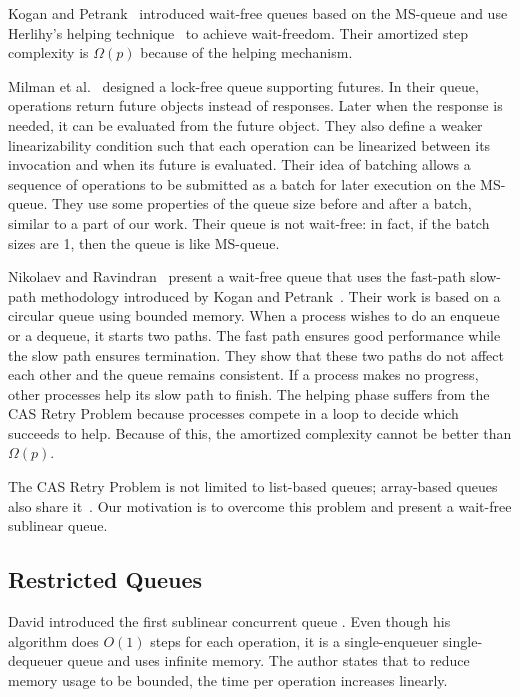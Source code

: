 \documentclass[acmsmall,nonacm,anonymous]{acmart}
\newcommand{\nf}[1]{{\normalfont{\texttt{#1}}}}
\begin{document}
Kogan and Petrank~\cite{DBLP:conf/ppopp/KoganP11} introduced wait-free queues based on the MS-queue and use Herlihy's helping technique~\cite{10.1145/114005.102808} to achieve wait-freedom. Their amortized step complexity is $\Omega(p)$ because of the helping mechanism.

Milman et al.~\cite{DBLP:conf/spaa/MilmanKLLP18} designed a lock-free queue supporting futures. In their queue, operations  return future objects instead of responses. Later when the response is needed, it can be evaluated from the future object. They also define a weaker linearizability condition such that each operation can be linearized between its invocation and when its future is evaluated. Their idea of batching allows a sequence of operations to be submitted as a batch for later execution on the MS-queue. They use some properties of the queue size before and after a batch, similar to a part of our work. Their queue is not wait-free: in fact, if the batch sizes are 1, then the queue is like MS-queue.

Nikolaev and Ravindran~\cite{10.1145/3490148.3538572} present a wait-free queue that uses the fast-path slow-path methodology introduced by Kogan and Petrank~\cite{10.1145/2370036.2145835}. Their work is based on a circular queue using bounded memory. When a process wishes to do an enqueue or a dequeue, it starts two paths. The fast path  ensures good performance while the slow path ensures termination. They show that these two paths do not affect each other and the queue remains consistent. If a process makes no progress, other processes help its slow path to finish. The helping phase suffers from the CAS Retry Problem because processes compete in a \nf{CAS} loop to decide which succeeds to help. Because of this, the amortized complexity cannot be better than $\Omega(p)$.

The CAS Retry Problem is not limited to list-based queues; array-based queues also share it~\cite{DBLP:conf/iceccs/ColvinG05,DBLP:conf/icdcn/Shafiei09,DBLP:conf/spaa/TsigasZ01}.  Our motivation is to overcome this problem and present a wait-free sublinear queue.

\subsection{Restricted Queues}

David introduced the first sublinear concurrent queue \cite{DBLP:conf/wdag/David04}. Even though his algorithm does $O(1)$ steps for each operation, it is a single-enqueuer single-dequeuer queue and uses infinite memory.
The author states that to reduce memory usage to be bounded, the time per operation increases linearly.
\end{document}
